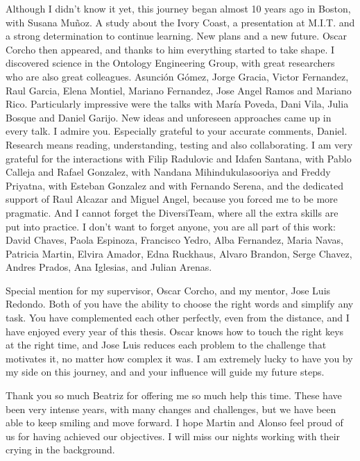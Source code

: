 

\begin{acknowledgements}      %

Although I didn't know it yet, this journey began almost 10 years ago in Boston, with Susana Muñoz. A study about the Ivory Coast, a presentation at M.I.T. and a strong determination to continue learning. New plans and a new future. Oscar Corcho then appeared, and thanks to him everything started to take shape. I discovered science in the Ontology Engineering Group, with great researchers who are also great colleagues. Asunción Gómez, Jorge Gracia, Victor Fernandez, Raul Garcia, Elena Montiel, Mariano Fernandez, Jose Angel Ramos and Mariano Rico. Particularly impressive were the talks with María Poveda, Dani Vila, Julia Bosque and Daniel Garijo. New ideas and unforeseen approaches came up in every talk. I admire you. Especially grateful to your accurate comments, Daniel. Research means reading, understanding, testing and also collaborating. I am very grateful for the interactions with Filip Radulovic and Idafen Santana, with Pablo Calleja and Rafael Gonzalez, with Nandana Mihindukulasooriya and Freddy Priyatna, with Esteban Gonzalez and with Fernando Serena, and the dedicated support of Raul Alcazar and Miguel Angel, because you forced me to be more pragmatic. And I cannot forget the DiversiTeam, where all the extra skills are put into practice. I don't want to forget anyone, you are all part of this work: David Chaves, Paola Espinoza, Francisco Yedro, Alba Fernandez, Maria Navas, Patricia Martin, Elvira Amador, Edna Ruckhaus, Alvaro Brandon, Serge Chavez, Andres Prados, Ana Iglesias, and Julian Arenas.

Special mention for my supervisor, Oscar Corcho, and my mentor, Jose Luis Redondo. Both of you have the ability to choose the right words and simplify any task. You have complemented each other perfectly, even from the distance, and I have enjoyed every year of this thesis. Oscar knows how to touch the right keys at the right time, and Jose Luis reduces each problem to the challenge that motivates it, no matter how complex it was. I am extremely lucky to have you by my side on this journey, and and your influence will guide my future steps.

Thank you so much Beatriz for offering me so much help this time. These have been very intense years, with many changes and challenges, but we have been able to keep smiling and move forward. I hope Martin and Alonso feel proud of us for having achieved our objectives. I will miss our nights working with their crying in the background.


\end{acknowledgements}
